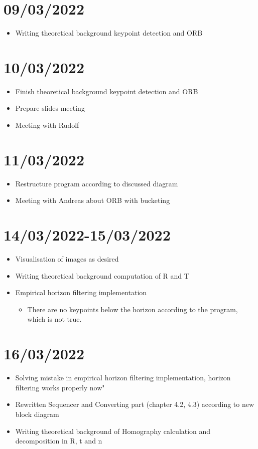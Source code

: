 \section{09/03/2022}
\begin{itemize}
    \item Writing theoretical background keypoint detection and ORB
\end{itemize}

\section{10/03/2022}
\begin{itemize}
    \item Finish theoretical background keypoint detection and ORB
    \item Prepare slides meeting
    \item Meeting with Rudolf
\end{itemize}

\section{11/03/2022}
\begin{itemize}
    \item Restructure program according to discussed diagram
    \item Meeting with Andreas about ORB with bucketing
\end{itemize}

\section{14/03/2022-15/03/2022}
\begin{itemize}
    \item Visualisation of images as desired
    \item Writing theoretical background computation of R and T
    \item Empirical horizon filtering implementation
    \begin{itemize}
        \item There are no keypoints below the horizon according to the program, which is not true.
    \end{itemize}
\end{itemize}

\section{16/03/2022}
\begin{itemize}
    \item Solving mistake in empirical horizon filtering implementation, horizon filtering works properly now"
    \item Rewritten Sequencer and Converting part (chapter 4.2, 4.3) according to new block diagram
    \item Writing theoretical background of Homography calculation and decomposition in R, t and n
\end{itemize}